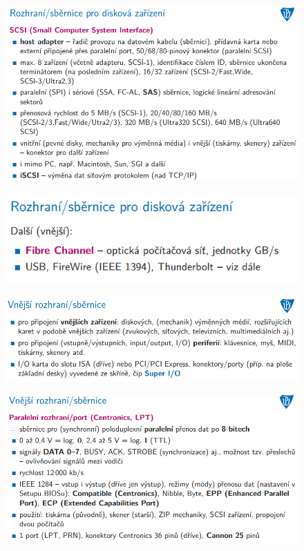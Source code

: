 \documentclass[10pt,a4paper]{article}
\begin{document}
\begin{figure} [h]
	\includegraphics[scale=0.65]{img/prvni_odstavec/otazka4/rozhrani_vnitrni4.png}	
\end{figure}

\begin{figure} [h]
	\includegraphics[scale=0.65]{img/prvni_odstavec/otazka4/rozhrani_vnitrni5.png}	
\end{figure}

\begin{figure} [h]
	\includegraphics[scale=0.65]{img/prvni_odstavec/otazka4/rozhrani_vnejsi1.png}	
\end{figure}

\begin{figure} [h]
	\includegraphics[scale=0.65]{img/prvni_odstavec/otazka4/rozhrani_vnejsi2.png}	
\end{figure}
\end{document}
